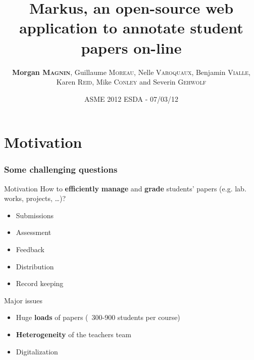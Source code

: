 \documentclass[hyperref,french,usenames,xcolor=dvipsnames]{beamer}
\title[MarkUs]%
{Markus, an open-source web application to annotate student papers on-line}
\author[MM, GM, NV, BV, KR, MC, SG]%
{\textbf{Morgan \textsc{Magnin}}, Guillaume \textsc{Moreau}, Nelle \textsc{Varoquaux}, Benjamin \textsc{Vialle}, Karen \textsc{Reid}, Mike \textsc{Conley} and Severin \textsc{Gehwolf}
}
\institute[ ]{
\structure{
École Centrale de Nantes / University of Toronto}
}
\date[07/03/2012]{ASME 2012 ESDA - 07/03/12}
\begin{document}
\frame{\titlepage}


\section*{Motivation}


\frame
{
  \frametitle{Some challenging questions}

\begin{alertblock}{Motivation}
How to \textbf{efficiently} \textbf{manage} and \textbf{grade} students' papers (e.g. lab. works, projects, …)? \\
\begin{itemize}
        \item Submissions 
        \item Assessment  
        \item Feedback
        \item Distribution
        \item Record keeping
\end{itemize}
\end{alertblock}

\begin{alertblock}{Major issues}
\begin{itemize}
\item Huge \textbf{loads} of papers (~300-900 students per course) 
\item \textbf{Heterogeneity} of the teachers team
\item Digitalization 
\end{itemize}
\end{alertblock}
}
\end{document}
